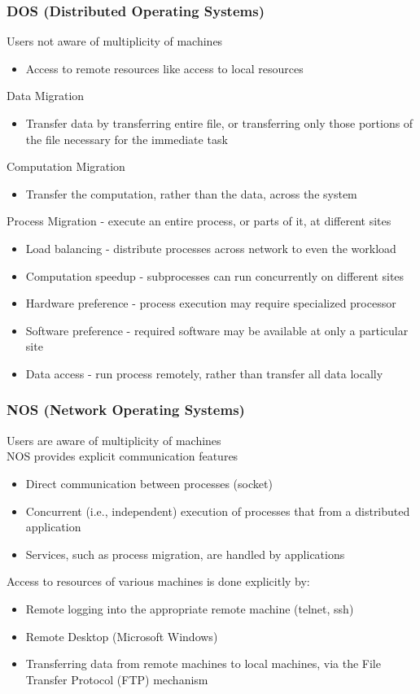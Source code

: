 \subsubsection{DOS (Distributed Operating Systems)}
Users not aware of multiplicity of machines
\begin{itemize}
    \item Access to remote resources like access to local resources
\end{itemize}
Data Migration
\begin{itemize}
    \item Transfer data by transferring entire file, or transferring only those portions of the file necessary for the immediate task
\end{itemize}
Computation Migration
\begin{itemize}
    \item Transfer the computation, rather than the data, across the system
\end{itemize}
Process Migration - execute an entire process, or parts of it, at different sites
\begin{itemize}
    \item Load balancing - distribute processes across network to even the workload
    \item Computation speedup - subprocesses can run concurrently on different sites
    \item Hardware preference - process execution may require specialized processor
    \item Software preference - required software may be available at only a particular site
    \item Data access - run process remotely, rather than transfer all data locally
\end{itemize}

\subsubsection{NOS (Network Operating Systems)}
Users are aware of multiplicity of machines
\\NOS provides explicit communication features
\begin{itemize}
    \item Direct communication between processes (socket)
    \item Concurrent (i.e., independent) execution of processes that from a distributed application
    \item Services, such as process migration, are handled by applications
\end{itemize}
Access to resources of various machines is done explicitly by:
\begin{itemize}
    \item Remote logging into the appropriate remote machine (telnet, ssh)
    \item Remote Desktop (Microsoft Windows)   
    \item Transferring data from remote machines to local machines, via the File Transfer Protocol (FTP) mechanism
\end{itemize}

